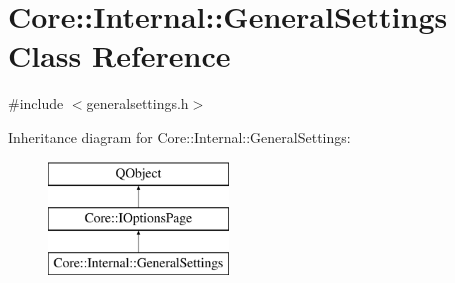 \hypertarget{class_core_1_1_internal_1_1_general_settings}{\section{Core\-:\-:Internal\-:\-:General\-Settings Class Reference}
\label{class_core_1_1_internal_1_1_general_settings}
}


{\ttfamily \#include $<$generalsettings.\-h$>$}

Inheritance diagram for Core\-:\-:Internal\-:\-:General\-Settings\-:\begin{figure}[H]
\begin{center}
\leavevmode
\includegraphics[height=3.000000cm]{class_core_1_1_internal_1_1_general_settings}
\end{center}
\end{figure}
